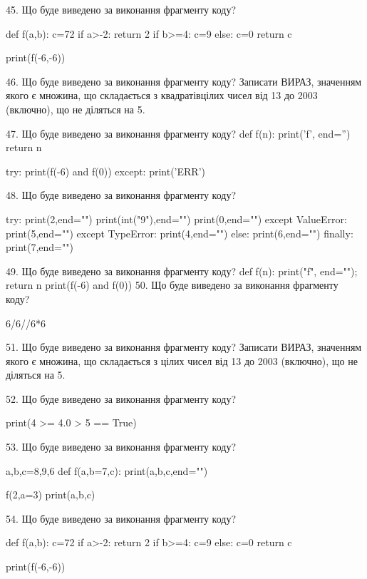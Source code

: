 \documentclass[11pt]{article}
\begin{document}
45. Що буде виведено за виконання фрагменту коду?

def f(a,b):
    c=72
    if a>-2:
        return 2
    if b>=4:
         c=9
    else: 
        c=0
    return c

print(f(-6,-6))

46. Що буде виведено за виконання фрагменту коду?
Записати ВИРАЗ, значенням якого є множина, що складається з квадратівцілих чисел від 13 до 2003 (включно), що не діляться на 5.

47. Що буде виведено за виконання фрагменту коду?
def f(n):
    print('f', end='')
    return n

try:
    print(f(-6) and f(0))
except:
    print('ERR')

48. Що буде виведено за виконання фрагменту коду?

try:
    print(2,end="")
    print(int("9"),end="")
    print(0,end="")
except ValueError: print(5,end="")
except TypeError: print(4,end="")
else: print(6,end="")
finally: print(7,end="")


49. Що буде виведено за виконання фрагменту коду?
def f(n): print("f", end=""); return n
   print(f(-6) and f(0))
50. Що буде виведено за виконання фрагменту коду?

6/6//6*6

51. Що буде виведено за виконання фрагменту коду?
Записати ВИРАЗ, значенням якого є множина, що складається з цілих чисел від 13 до 2003 (включно), що не діляться на 5.

52. Що буде виведено за виконання фрагменту коду?

print(4 >= 4.0 > 5 == True)

53. Що буде виведено за виконання фрагменту коду?

a,b,c=8,9,6
def f(a,b=7,c):
    print(a,b,c,end="")

f(2,a=3)
print(a,b,c)


54. Що буде виведено за виконання фрагменту коду?

def f(a,b):
    c=72
    if a>-2:
        return 2
    if b>=4:
         c=9
    else: 
        c=0
    return c

print(f(-6,-6))
\end{document}
